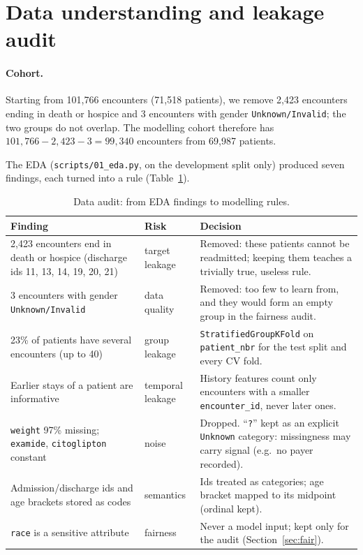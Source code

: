 \documentclass[11pt,a4paper]{article}
\newcommand{\code}[1]{\texttt{\small #1}}
\begin{document}
\section{Data understanding and leakage audit}
\label{sec:eda}

\paragraph{Cohort.} Starting from 101{,}766 encounters (71{,}518 patients), we remove 2{,}423 encounters ending in death or hospice and 3 encounters with gender \code{Unknown/Invalid}; the two groups do not overlap. The modelling cohort therefore has $101{,}766 - 2{,}423 - 3 = 99{,}340$ encounters from 69{,}987 patients.

The EDA (\code{scripts/01\_eda.py}, on the development split only) produced seven findings, each turned into a rule (Table~\ref{tab:audit}).

\begin{table}[H]
\centering\small
\begin{tabular}{p{5.2cm}p{2.4cm}p{7.6cm}}
\toprule
Finding & Risk & Decision \\
\midrule
2{,}423 encounters end in death or hospice (discharge ids 11, 13, 14, 19, 20, 21) & target leakage & Removed: these patients cannot be readmitted; keeping them teaches a trivially true, useless rule. \\
3 encounters with gender \code{Unknown/Invalid} & data quality & Removed: too few to learn from, and they would form an empty group in the fairness audit. \\
23\% of patients have several encounters (up to 40) & group leakage & \code{StratifiedGroupKFold} on \code{patient\_nbr} for the test split and every CV fold. \\
Earlier stays of a patient are informative & temporal leakage & History features count only encounters with a smaller \code{encounter\_id}, never later ones. \\
\code{weight} 97\% missing; \code{examide}, \code{citoglipton} constant & noise & Dropped. ``\code{?}'' kept as an explicit \code{Unknown} category: missingness may carry signal (e.g.\ no payer recorded). \\
Admission/discharge ids and age brackets stored as codes & semantics & Ids treated as categories; age bracket mapped to its midpoint (ordinal kept). \\
\code{race} is a sensitive attribute & fairness & Never a model input; kept only for the audit (Section~\ref{sec:fair}). \\
\bottomrule
\end{tabular}
\caption{Data audit: from EDA findings to modelling rules.}
\label{tab:audit}
\end{table}
\end{document}
